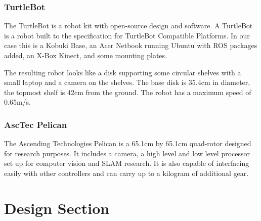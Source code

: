 \documentclass{article}
\begin{document}
		\subsubsection{TurtleBot}
		
		The TurtleBot is a robot kit with open-source design and software. A TurtleBot is a robot built to the specification for TurtleBot Compatible Platforms\cite{wise_foote_2011}. In our case this is a Kobuki Base, an Acer Netbook running Ubuntu with ROS packages added, an X-Box Kinect, and some mounting plates. 
		
		The resulting robot looks like a disk supporting some circular shelves with a small laptop and a camera on the shelves. The base disk is 35.4cm in diameter, the topmost shelf is 42cm from the ground. The robot has a maximum speed of 0.65m/s. 
		
		\subsubsection{AscTec Pelican}
		
		The Ascending Technologies Pelican is a 65.1cm by 65.1cm quad-rotor  designed for research purposes\cite{asctec}. It includes a camera, a high level and low level processor set up for computer vision and SLAM research. It is also capable of interfacing easily with other controllers and can carry up to a kilogram of additional gear.
		
\section{Design Section}
\end{document}
